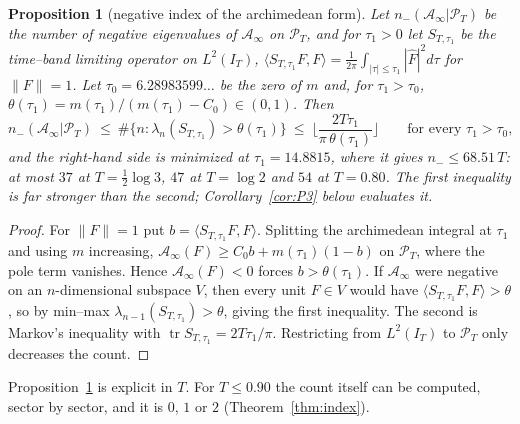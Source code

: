 \documentclass[11pt]{amsart}
\newtheorem{proposition}[theorem]{Proposition}
\theoremstyle{definition}
\theoremstyle{remark}
\newcommand{\PT}{\mathcal P_T}
\newcommand{\IT}{I_T}
\newcommand{\Fh}{\widehat F}
\newcommand{\Ainf}{\mathcal A_\infty}
\begin{document}
\begin{proposition}[negative index of the archimedean form]\label{prop:NC}
Let $n_-(\Ainf|\PT)$ be the number of negative eigenvalues of $\Ainf$ on $\PT$, and for $\tau_1>0$ let
$S_{T,\tau_1}$ be the time--band limiting operator on $L^2(\IT)$, $\langle
S_{T,\tau_1}F,F\rangle=\frac1{2\pi}\int_{|\tau|\le\tau_1}|\Fh|^2d\tau$ for $\|F\|=1$. Let
$\tau_0=6.28983599\ldots$ be the zero of $m$ and, for $\tau_1>\tau_0$,
$\theta(\tau_1)=m(\tau_1)/(m(\tau_1)-C_0)\in(0,1)$. Then
\[
n_-(\Ainf|\PT)\ \le\ \#\{n:\lambda_n(S_{T,\tau_1})>\theta(\tau_1)\}\ \le\
\Big\lfloor\frac{2T\tau_1}{\pi\,\theta(\tau_1)}\Big\rfloor
\qquad\text{for every }\tau_1>\tau_0,
\]
and the right-hand side is minimized at $\tau_1=14.8815$, where it gives $n_-\le68.51\,T$: at most
$37$ at $T=\frac12\log3$, $47$ at $T=\log2$ and $54$ at $T=0.80$. The first inequality is far
stronger than the second; Corollary~\ref{cor:P3} below evaluates it.
\end{proposition}
\begin{proof}
For $\|F\|=1$ put $b=\langle S_{T,\tau_1}F,F\rangle$. Splitting the archimedean integral at $\tau_1$
and using $m$ increasing, $\Ainf(F)\ge C_0b+m(\tau_1)(1-b)$ on $\PT$, where the pole term vanishes.
Hence $\Ainf(F)<0$ forces $b>\theta(\tau_1)$. If $\Ainf$ were negative on an $n$-dimensional subspace
$V$, then every unit $F\in V$ would have $\langle S_{T,\tau_1}F,F\rangle>\theta$, so by min--max
$\lambda_{n-1}(S_{T,\tau_1})>\theta$, giving the first inequality. The second is Markov's inequality
with $\operatorname{tr}S_{T,\tau_1}=2T\tau_1/\pi$. Restricting from $L^2(\IT)$ to $\PT$ only decreases
the count.
\end{proof}
Proposition~\ref{prop:NC} is explicit in $T$. For $T\le0.90$ the count itself can be computed, sector
by sector, and it is $0$, $1$ or $2$ (Theorem~\ref{thm:index}).
\end{document}

